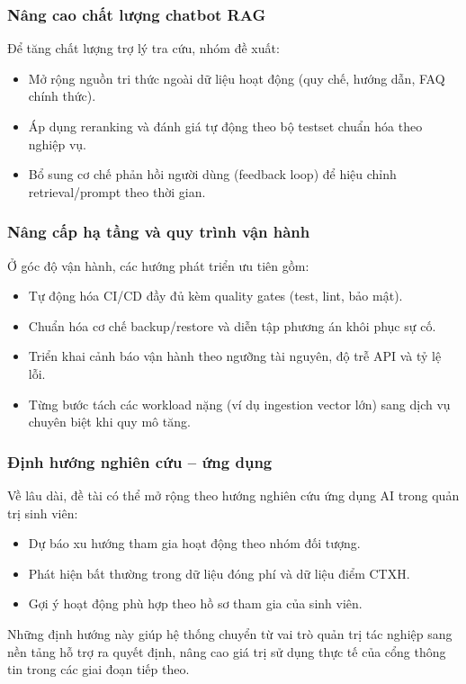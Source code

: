 \subsubsection{Nâng cao chất lượng chatbot RAG}
Để tăng chất lượng trợ lý tra cứu, nhóm đề xuất:
\begin{itemize}
	\item Mở rộng nguồn tri thức ngoài dữ liệu hoạt động (quy chế, hướng dẫn, FAQ chính thức).
	\item Áp dụng reranking và đánh giá tự động theo bộ testset chuẩn hóa theo nghiệp vụ.
	\item Bổ sung cơ chế phản hồi người dùng (feedback loop) để hiệu chỉnh retrieval/prompt theo thời gian.
\end{itemize}

\subsubsection{Nâng cấp hạ tầng và quy trình vận hành}
Ở góc độ vận hành, các hướng phát triển ưu tiên gồm:
\begin{itemize}
	\item Tự động hóa CI/CD đầy đủ kèm quality gates (test, lint, bảo mật).
	\item Chuẩn hóa cơ chế backup/restore và diễn tập phương án khôi phục sự cố.
	\item Triển khai cảnh báo vận hành theo ngưỡng tài nguyên, độ trễ API và tỷ lệ lỗi.
	\item Từng bước tách các workload nặng (ví dụ ingestion vector lớn) sang dịch vụ chuyên biệt khi quy mô tăng.
\end{itemize}

\subsubsection{Định hướng nghiên cứu -- ứng dụng}
Về lâu dài, đề tài có thể mở rộng theo hướng nghiên cứu ứng dụng AI trong quản trị sinh viên:
\begin{itemize}
	\item Dự báo xu hướng tham gia hoạt động theo nhóm đối tượng.
	\item Phát hiện bất thường trong dữ liệu đóng phí và dữ liệu điểm CTXH.
	\item Gợi ý hoạt động phù hợp theo hồ sơ tham gia của sinh viên.
\end{itemize}

Những định hướng này giúp hệ thống chuyển từ vai trò quản trị tác nghiệp sang nền tảng hỗ trợ ra quyết định, nâng cao giá trị sử dụng thực tế của cổng thông tin trong các giai đoạn tiếp theo.

\clearpage